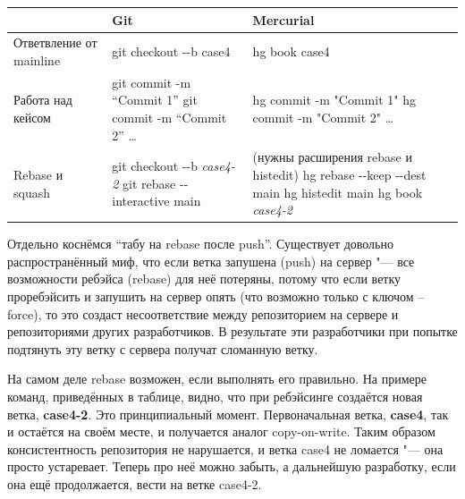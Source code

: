 \documentclass[10pt, a5paper]{article}
\begin{document}
\begin{table}
  \centering
  \begin{tabular}{P{2.5cm}|P{3.5cm}|P{3.5cm}}
    \hline
                                  ~  & \textbf{Git}                   & \textbf{Mercurial}          \\ \hline
    Ответвление от mainline          & git checkout -{}-b case4       & hg book case4              \\
    Работа над кейсом                & git commit -m ``Commit 1'' \newline
                                       git commit -m ``Commit 2'' \ldots{}
                                                                    & hg commit -m "Commit 1" \newline
                                                                      hg commit -m "Commit 2" \ldots{} \\
    Rebase и squash              & git checkout -{}-b \emph{case4-2} \newline
                                   git rebase -{}-interactive main
                                                     & (нужны расширения rebase и histedit) \newline
                                                       hg rebase -{}-keep -{}-dest main \newline
                                                       hg histedit main \newline
                                                       hg book \emph{case4-2}      \\
    \hline
  \end{tabular}
\end{table}
Отдельно коснёмся ``табу на rebase после push''. Существует довольно распространённый миф, что если ветка запушена (push) на сервер "--- все возможности ребэйса (rebase) для неё потеряны, потому что если ветку проребэйсить и запушить на сервер опять (что возможно только с ключом --force), то это создаст несоответствие между репозиторием на сервере и репозиториями других разработчиков. В результате эти разработчики при попытке подтянуть эту ветку с сервера получат сломанную ветку.

На самом деле rebase возможен, если выполнять его правильно. На примере команд, приведённых в таблице, видно, что при ребэйсинге создаётся новая ветка, \textbf{case4-2}. Это принципиальный момент. Первоначальная ветка, \textbf{case4}, так и остаётся на своём месте, и получается аналог copy-on-write. Таким образом консистентность репозитория не нарушается, и ветка case4 не ломается "--- она просто устаревает. Теперь про неё можно забыть, а дальнейшую разработку, если она ещё продолжается, вести на ветке case4-2.
\end{document}
